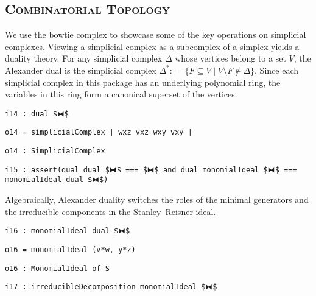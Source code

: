 \documentclass[12pt,leqno]{amsart}
\theoremstyle{definition}
\newcommand{\colequal}{\ensuremath{:\!=}}
\begin{document}
\subsection*{\scshape\mdseries Combinatorial Topology}

We use the bowtie complex to showcase some of the key operations on simplicial
complexes. Viewing a simplicial complex as a subcomplex of a simplex yields a
duality theory. For any simplicial complex $\Delta$ whose vertices belong to a
set $V$, the Alexander dual is the simplicial complex
$\Delta^* \colequal \{ F \subseteq V \mathrel{|} V \setminus F \not\in \Delta \}$.
Since each simplicial complex in this package has an underlying polynomial
ring, the variables in this ring form a canonical superset of the vertices.
\begin{lstlisting}[xleftmargin=10pt, aboveskip=3.0pt, belowskip=1.5pt]
i14 : dual $⧓$
\end{lstlisting}
\begin{lstlisting}[xleftmargin=10pt, aboveskip=1.5pt, belowskip=1.5pt]
o14 = simplicialComplex | wxz vxz wxy vxy |
\end{lstlisting}
\begin{lstlisting}[xleftmargin=10pt, aboveskip=1.5pt, belowskip=1.5pt]
o14 : SimplicialComplex
\end{lstlisting}
\begin{lstlisting}[xleftmargin=10pt, aboveskip=1.5pt, belowskip=1.5pt]
i15 : assert(dual dual $⧓$ === $⧓$ and dual monomialIdeal $⧓$ === monomialIdeal dual $⧓$)
\end{lstlisting}
Algebraically, Alexander duality switches the roles of the minimal generators
and the irreducible components in the Stanley--Reisner ideal.
\begin{lstlisting}[xleftmargin=10pt, aboveskip=3pt, belowskip=1.5pt]
i16 : monomialIdeal dual $⧓$
\end{lstlisting}
\begin{lstlisting}[xleftmargin=10pt, lineskip=-10pt, aboveskip=4pt, belowskip=1pt]
o16 = monomialIdeal (v*w, y*z)
\end{lstlisting}
\begin{lstlisting}[xleftmargin=10pt, aboveskip=1.5pt, belowskip=1.5pt]
o16 : MonomialIdeal of S
\end{lstlisting}
\begin{lstlisting}[xleftmargin=10pt, aboveskip=1.5pt, belowskip=1.5pt]
i17 : irreducibleDecomposition monomialIdeal $⧓$
\end{lstlisting}
\end{document}
